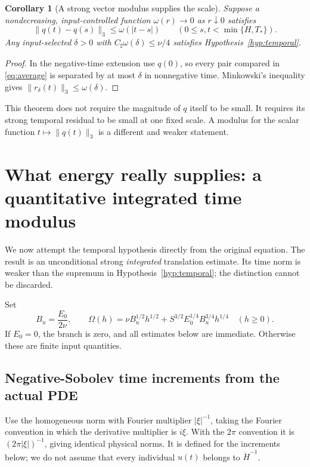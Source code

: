 \documentclass[11pt,a4paper]{article}
\newtheorem{corollary}[theorem]{Corollary}
\theoremstyle{definition}\newtheorem{definition}[theorem]{Definition}
\theoremstyle{remark}\newtheorem{remark}[theorem]{Remark}
\newcommand{\norm}[1]{\lVert #1\rVert}
\numberwithin{equation}{section}
\begin{document}
\begin{corollary}[A strong vector modulus supplies the scale]\label{cor:modulus}
Suppose a nondecreasing, input-controlled function $\omega(r)\to0$ as $r\downarrow0$ satisfies
\begin{equation}\label{eq:vectormodulus}
 \norm{q(t)-q(s)}_3\le\omega(|t-s|)
 \qquad(0\le s,t<\min\{H,T_*\}).
\end{equation}
Any input-selected $\delta>0$ with $C_\sharp\omega(\delta)\le\nu/4$ satisfies Hypothesis~\ref{hyp:temporal}.
\end{corollary}
\begin{proof}
In the negative-time extension use $q(0)$, so every pair compared in \eqref{eq:average} is separated by at most $\delta$ in nonnegative time. Minkowski's inequality gives $\norm{r_\delta(t)}_3\le\omega(\delta)$.
\end{proof}
This theorem does not require the magnitude of $q$ itself to be small. It requires its strong temporal residual to be small at one fixed scale. A modulus for the scalar function $t\mapsto\norm{q(t)}_3$ is a different and weaker statement.

\section{What energy really supplies: a quantitative integrated time modulus}
\label{sec:increments}
We now attempt the temporal hypothesis directly from the original equation. The result is an unconditional strong \emph{integrated} translation estimate. Its time norm is weaker than the supremum in Hypothesis~\ref{hyp:temporal}; the distinction cannot be discarded.

Set
\begin{equation}\label{eq:BUOmega}
 B_u=\frac{E_0}{2\nu},\qquad
 \Omega(h)=\nu B_u^{1/2}h^{1/2}
       +S^{3/2}E_0^{1/4}B_u^{3/4}h^{1/4}\quad(h\ge0).
\end{equation}
If $E_0=0$, the branch is zero, and all estimates below are immediate. Otherwise these are finite input quantities.

\subsection{Negative-Sobolev time increments from the actual PDE}
Use the homogeneous norm with Fourier multiplier $|\xi|^{-1}$, taking the Fourier convention in which the derivative multiplier is $i\xi$. With the $2\pi$ convention it is $(2\pi|\xi|)^{-1}$, giving identical physical norms. It is defined for the increments below; we do not assume that every individual $u(t)$ belongs to $\dot H^{-1}$.
\end{document}
